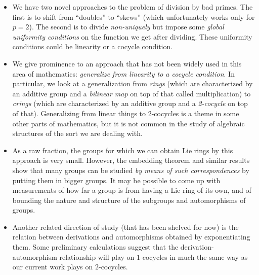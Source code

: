 \documentclass[10pt]{amsart}
\begin{document}
\begin{itemize}
\item We have two novel approaches to the problem of division by bad
  primes. The first is to shift from ``doubles'' to ``skews'' (which
  unfortunately works only for $p = 2$). The second is to divide {\em
  non-uniquely} but impose some {\em global uniformity conditions} on
  the function we get after dividing. These uniformity conditions
  could be linearity or a cocycle condition.
\item We give prominence to an approach that has not been widely used
  in this area of mathematics: {\em generalize from linearity to a
  cocycle condition}. In particular, we look at a generalization from
  {\em rings} (which are characterized by an additive group and a {\em
  bilinear map} on top of that called multiplication) to {\em crings}
  (which are characterized by an additive group and a {\em 2-cocycle}
  on top of that). Generalizing from linear things to 2-cocycles is a
  theme in some other parts of mathematics, but it is not common in
  the study of algebraic structures of the sort we are dealing with.
\item As a raw fraction, the groups for which we can obtain Lie rings
  by this approach is very small. However, the embedding theorem and
  similar results show that many groups can be studied {\em by means
  of such correspondences} by putting them in bigger groups. It may be
  possible to come up with measurements of how far a group is from
  having a Lie ring of its own, and of bounding the nature and
  structure of the subgroups and automorphisms of groups.
\item Another related direction of study (that has been shelved for
  now) is the relation between derivations and automorphisms obtained
  by exponentiating them. Some preliminary calculations suggest that
  the derivation-automorphism relationship will play on $1$-cocycles
  in much the same way as our current work plays on $2$-cocycles.
\end{itemize}
\end{document}
